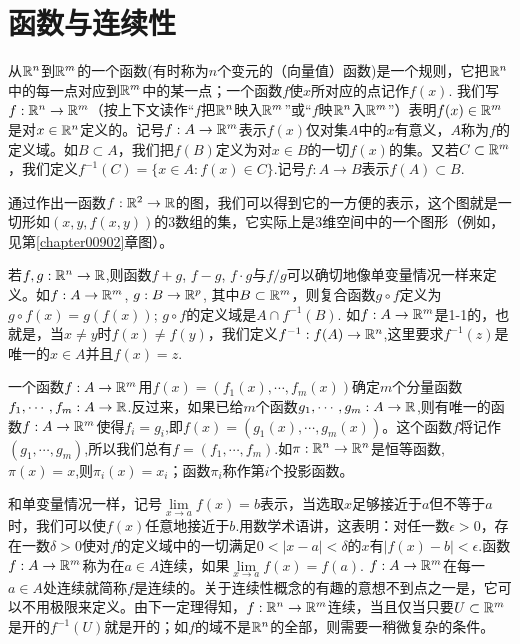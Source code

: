 \section{函数与连续性}\label{section0090103}
从$\mathbb{R}^n$到$\mathbb{R}^m$的一个函数(有时称为$n$个变元的（向量值）函数)是一个规则，它把$\mathbb{R}^n$中的每一点对应到$\mathbb{R}^m$中的某一点；一个函数$f$使$x$所对应的点记作$f(x)$. 我们写$f:\mathbb{R}^n \to \mathbb{R}^m$（按上下文读作“$f$把$\mathbb{R}^n$映入$\mathbb{R}^m$”或“$f$映$\mathbb{R}^n$入$\mathbb{R}^m$”）表明$f(x) \in \mathbb{R}^m$是对$x \in \mathbb{R}^n$定义的。记号$f: A \to \mathbb{R}^m$表示$f(x)$仅对集$A$中的$x$有意义，$A$称为$f$的定义域。如$B \subset A$，我们把$f(B)$定义为对$x \in B$的一切$f(x)$的集。又若$C \subset \mathbb{R}^m$，我们定义$f^{-1}(C) = \{x \in A:f(x) \in C\}$.记号$f:A \to B$表示$f(A) \subset B$.

通过作出一函数$f: \mathbb{R}^2 \to \mathbb{R}$的图，我们可以得到它的一方便的表示，这个图就是一切形如$(x, y, f(x, y))$的3数组的集，它实际上是3维空间中的一个图形（例如，见第\ref{chapter00902}章图）。

若$f,g:\mathbb{R}^n \to \mathbb{R}$,则函数$f+g$, $f-g$, $f \cdot g$与$f/g$可以确切地像单变量情况一样来定义。如$f:A \to \mathbb{R}^m$, $g: B \to \mathbb{R}^p$, 其中$B \subset \mathbb{R}^m$，则复合函数$g \circ f$定义为$g\circ f(x)= g(f(x))$; $g \circ f$的定义域是$A \cap f^{-1}(B)$. 如$f: A \to \mathbb{R}^m$是1-1的，也就是，当$x \neq y$时$f(x) \neq f(y)$，我们定义$f^{-1}:f(A) \to \mathbb{R}^n$,这里要求$f^{-1}(z)$是唯一的$x \in A$并且$f(x)=z$.

一个函数$f:A \to \mathbb{R}^m$用$f(x)=(f_1(x), \cdots, f_m(x))$确定$m$个分量函数$f_1, \cdots, f_m:A \to \mathbb{R}$.反过来，如果已给$m$个函数$g_1,\cdots, g_m:A \to \mathbb{R}$,则有唯一的函数$f:A \to \mathbb{R}^m$使得$f_i = g_i$,即$f(x)=(g_1(x),\cdots, g_m(x))$。这个函数$f$将记作$(g_1, \cdots, g_m)$,所以我们总有$f=(f_1,\cdots, f_m)$.如$\pi:\mathbb{R}^n \to \mathbb{R}^n$是恒等函数, $\pi(x)=x$,则$\pi_i(x)=x_i$；函数$\pi_i$称作第$i$个投影函数。

和单变量情况一样，记号$\lim\limits_{x \to a}{f(x)} = b$表示，当选取$x$足够接近于$a$但不等于$a$时，我们可以使$f(x)$任意地接近于$b$.用数学术语讲，这表明：对任一数$\epsilon>0$，存在一数$\delta>0$使对$f$的定义域中的一切满足$0 < |x-a| < \delta$的$x$有$|f(x) - b| < \epsilon$.函数$f:A \to \mathbb{R}^m$称为在$a \in A$连续，如果$\lim\limits_{x \to a}{f(x)} = f(a)$. $f:A \to \mathbb{R}^m$在每一$a \in A$处连续就简称$f$是连续的。关于连续性概念的有趣的意想不到点之一是，它可以不用极限来定义。由下一定理得知，$f:\mathbb{R}^n \to \mathbb{R}^m$连续，当且仅当只要$U \subset \mathbb{R}^m$是开的$f^{-1}(U)$就是开的；如$f$的域不是$\mathbb{R}^n$的全部，则需要一稍微复杂的条件。

